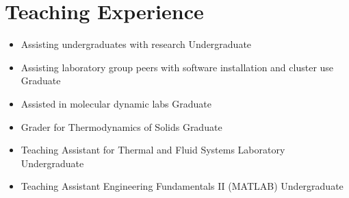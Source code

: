 \section{Teaching Experience}

\begin{itemize}
    \item Assisting undergraduates with research \hfill Undergraduate
    \item Assisting laboratory group peers with software installation and cluster use \hfill Graduate
    \item Assisted in molecular dynamic labs \hfill Graduate
    \item Grader for Thermodynamics of Solids \hfill Graduate
    \item Teaching Assistant for Thermal and Fluid Systems Laboratory \hfill Undergraduate
    \item Teaching Assistant Engineering Fundamentals II (MATLAB) \hfill Undergraduate
\end{itemize}
